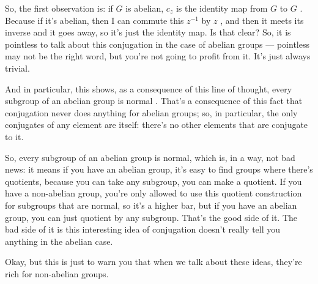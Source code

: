 \begin{speech}[00:17:18 - 00:19:03]
So, the first observation is: if $G$ is abelian, $c_z$ is the identity map from $G$ to $G$ . Because if it's abelian, then I can commute this $z^{-1}$ by $z$ , and then it meets its inverse and it goes away, so it's just the identity map. Is that clear? So, it is pointless to talk about this conjugation in the case of abelian groups --- pointless may not be the right word, but you're not going to profit from it. It's just always trivial.

And in particular, this shows, as a consequence of this line of thought, every subgroup of an abelian group is normal . That's a consequence of this fact that conjugation never does anything for abelian groups; so, in particular, the only conjugates of any element are itself: there's no other elements that are conjugate to it.

So, every subgroup of an abelian group is normal, which is, in a way, not bad news: it means if you have an abelian group, it's easy to find groups where there's quotients, because you can take any subgroup, you can make a quotient. If you have a non-abelian group, you're only allowed to use this quotient construction for subgroups that are normal, so it's a higher bar, but if you have an abelian group, you can just quotient by any subgroup. That's the good side of it. The bad side of it is this interesting idea of conjugation doesn't really tell you anything in the abelian case.

Okay, but this is just to warn you that when we talk about these ideas, they're rich for non-abelian groups.
\end{speech}

